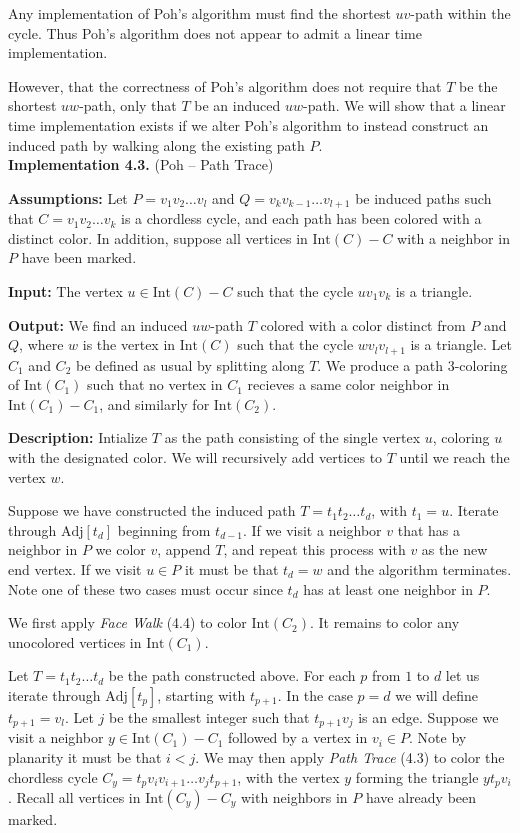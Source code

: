 \documentclass[letterpaper, 12pt]{amsart}
\theoremstyle{definition}
\theoremstyle{definition}
\theoremstyle{thm}
\theoremstyle{definition}
\begin{document}
Any implementation of Poh's algorithm must find the shortest $uv$-path
within the cycle.
Thus Poh's algorithm does not appear to admit a linear time implementation.

However, that the correctness of Poh's algorithm does not require that $T$
be the shortest $uw$-path, only that $T$ be an induced $uw$-path. We will show that a
linear time implementation exists if we alter Poh's algorithm to instead construct
an induced path by walking along the existing path $P$.\\

\noindent\textbf{Implementation 4.3.} (Poh -- Path Trace)

\noindent\textbf{Assumptions:} Let $P=v_1v_2\ldots v_l$ and
$Q=v_kv_{k-1}\ldots v_{l+1}$ be induced paths such that $C=v_1v_2\ldots v_k$ is
a chordless cycle, and each path has been colored with a distinct color. In
addition, suppose all vertices in $\text{Int}(C)- C$ with a neighbor in $P$
have been marked.

\noindent\textbf{Input:} The vertex $u\in \text{Int}(C)-C$ such that the cycle
$uv_1v_k$ is a triangle.

\noindent\textbf{Output:} We find an induced $uw$-path $T$ colored with a color distinct
from $P$ and $Q$, where $w$ is the vertex in $\text{Int}(C)$ such that the cycle
$wv_lv_{l+1}$ is a triangle.
Let $C_1$ and $C_2$ be defined as usual by splitting along $T$.
We produce a path $3$-coloring of $\text{Int}(C_1)$ such that
no vertex in $C_1$ recieves a same color neighbor in $\text{Int}(C_1)-C_1$,
and similarly for $\text{Int}(C_2)$.

\noindent\textbf{Description:} Intialize $T$ as the path consisting of the
single vertex $u$, coloring $u$ with the designated color. We will recursively
add vertices to $T$ until we reach the vertex $w$.

Suppose we have constructed the induced path $T=t_1t_2\ldots t_d$, with $t_1=u$.
Iterate through $\text{Adj}[t_d]$
beginning from $t_{d-1}$. If we visit a neighbor $v$ that has a neighbor in
$P$ we color $v$, append $T$, and repeat this process with $v$ as the new
end vertex. If we visit $u\in P$ it must be that $t_d=w$ and
the algorithm terminates. Note one of these two cases must occur since $t_d$
has at least one neighbor in $P$.

We first apply \textit{Face Walk} (4.4) to color $\text{Int}(C_2)$. It remains
to color any unocolored vertices in $\text{Int}(C_1)$.

Let $T=t_1t_2\ldots t_d$ be the path constructed above.
For each $p$ from $1$ to $d$ let us iterate through
$\text{Adj}[t_p]$, starting with $t_{p+1}$. In the case $p=d$ we will define
$t_{p+1}=v_l$. Let $j$ be the smallest integer such that $t_{p+1}v_j$ is an edge. Suppose
we visit a neighbor $y\in \text{Int}(C_1)-C_1$ followed by a vertex in $v_i\in P$.
Note by planarity it must be that $i<j$.
We may then apply \textit{Path Trace} (4.3) to color the chordless cycle
$C_y=t_pv_iv_{i+1}\ldots v_jt_{p+1}$, with the vertex $y$ forming the triangle $yt_pv_i$.
Recall all vertices in $\text{Int}(C_y)-C_y$ with neighbors in $P$ have already been
marked.\\
\end{document}
